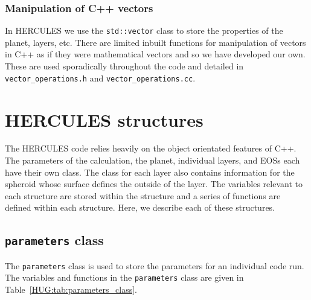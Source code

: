\documentclass[11pt, oneside]{article}   	%
\begin{document}
\subsubsection{Manipulation of C++ vectors}
In HERCULES we use the \texttt{std::vector} class to store the properties of the planet, layers, etc.
There are limited inbuilt functions for manipulation of vectors in C++ as if they were mathematical vectors and so we have developed our own.
These are used sporadically throughout the code and detailed in \texttt{vector\_operations.h} and \texttt{vector\_operations.cc}.

\section{HERCULES structures}
\label{HUG:sec:structures}
The HERCULES code relies heavily on the object orientated features of C++.
The parameters of the calculation, the planet, individual layers, and EOSs each have their own class. The class for each layer also contains information for the spheroid whose surface defines the outside of the layer.
The variables relevant to each structure are stored within the structure and a series of functions are defined within each structure.
Here, we describe each of these structures.

\subsection{\texttt{parameters} class}
\label{HUG:sec:param_class}

The \texttt{parameters} class is used to store the parameters for an individual code run. 
The variables and functions in the \texttt{parameters} class are given in Table~\ref{HUG:tab:parameters_class}.
\end{document}
